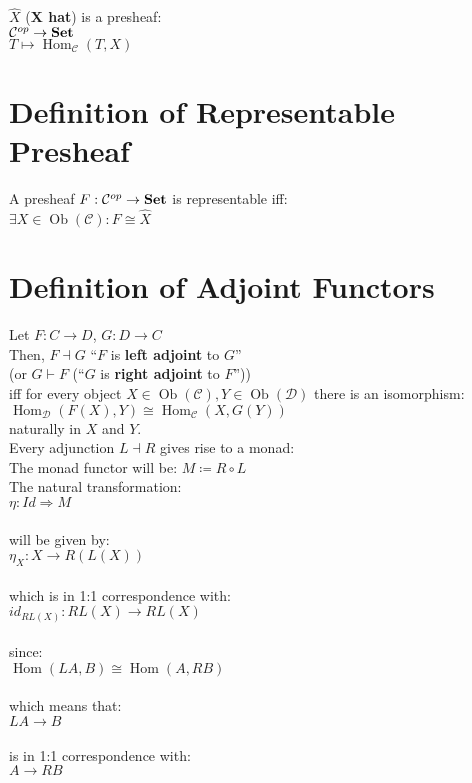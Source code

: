 \documentclass[a4paper, twoside, english, 11pt]{book}
\DeclareMathOperator{\Hom}{Hom}
\DeclareMathOperator{\Ob}{Ob}
\newcommand{\C}{\mathcal C}
\newcommand{\D}{\mathcal D}
\newcommand{\catname}[1]{{\normalfont\textbf{#1}}}
\newcommand{\Set}{\catname{Set}}
\begin{document}
$\hat X$ (\textbf{X hat}) is a presheaf: \\

$\C^{op} \rightarrow \Set$ \\
\indent
$T \mapsto \Hom_\C(T, X)$



\section{Definition of Representable Presheaf}

A presheaf $F : \C^{op} \rightarrow \Set$ is representable iff: \\

$\exists X \in \Ob(\C) : F \cong \hat X$



\section{Definition of Adjoint Functors}

Let $F : C \rightarrow D$, $G : D \rightarrow C$ \\

\noindent
Then, $F \dashv G$ ``$F$ is \textbf{left adjoint} to $G$'' \\
(or $G \vdash F$ (``$G$ is \textbf{right adjoint} to $F$'')) \\

\noindent
iff for every object $X \in \Ob(\C), Y \in \Ob(\D)$ there is an isomorphism: \\

$\Hom_\D(F(X), Y) \cong \Hom_\C(X, G(Y))$ \\

\noindent
naturally in $X$ and $Y$. \\

\noindent
Every adjunction $L \dashv R$ gives rise to a monad: \\

\noindent
The monad functor will be: $M \coloneqq R \circ L$ \\

\noindent
The natural transformation: \\
\indent
$\eta : Id \Rightarrow M$ \\\\
will be given by: \\
\indent
$\eta_X : X \rightarrow R(L(X))$ \\\\
which is in 1:1 correspondence with: \\
\indent
$id_{RL(X)} : RL(X) \rightarrow RL(X)$ \\\\
since: \\
\indent
$\Hom(LA, B) \cong \Hom(A, RB)$ \\\\
which means that: \\
\indent
$LA \rightarrow B$ \\\\
is in 1:1 correspondence with: \\
\indent
$A \rightarrow RB$ \\\\
\end{document}
